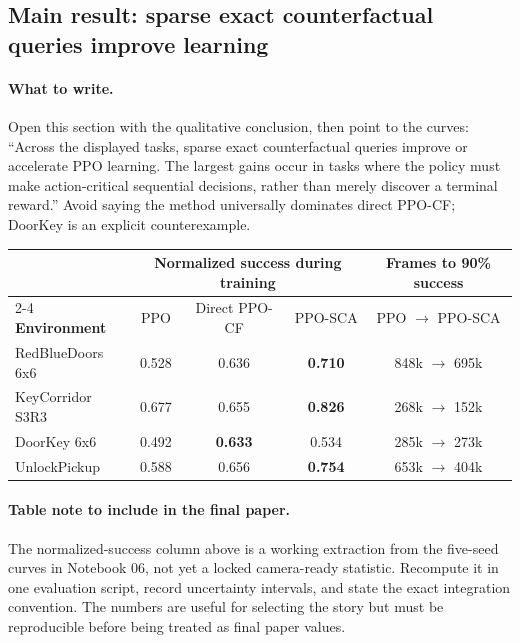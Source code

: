 \documentclass[11pt]{article}
\newcommand{\ppocf}{\textsc{PPO-CF}}
\newcommand{\pposca}{\textsc{PPO-SCA}}
\newcommand{\ppo}{\textsc{PPO}}
\begin{document}
\subsection{Main result: sparse exact counterfactual queries improve learning}

\paragraph{What to write.}
Open this section with the qualitative conclusion, then point to the curves:
``Across the displayed tasks, sparse exact counterfactual queries improve or
accelerate PPO learning. The largest gains occur in tasks where the policy must
make action-critical sequential decisions, rather than merely discover a
terminal reward.'' Avoid saying the method universally dominates direct
\ppocf{}; DoorKey is an explicit counterexample.

\begin{center}
\begin{tabular}{lcccc}
\toprule
& \multicolumn{3}{c}{Normalized success during training} &
Frames to 90\% success \\
\cmidrule(lr){2-4}
\textbf{Environment} & \ppo{} & Direct \ppocf{} & \pposca{} &
\ppo{} $\rightarrow$ \pposca{} \\
\midrule
RedBlueDoors 6x6 & 0.528 & 0.636 & \textbf{0.710} & 848k $\rightarrow$ 695k \\
KeyCorridor S3R3 & 0.677 & 0.655 & \textbf{0.826} & 268k $\rightarrow$ 152k \\
DoorKey 6x6 & 0.492 & \textbf{0.633} & 0.534 & 285k $\rightarrow$ 273k \\
UnlockPickup & 0.588 & 0.656 & \textbf{0.754} & 653k $\rightarrow$ 404k \\
\bottomrule
\end{tabular}
\end{center}

\paragraph{Table note to include in the final paper.}
The normalized-success column above is a working extraction from the five-seed
curves in Notebook 06, not yet a locked camera-ready statistic. Recompute it in
one evaluation script, record uncertainty intervals, and state the exact
integration convention. The numbers are useful for selecting the story but
must be reproducible before being treated as final paper values.
\end{document}
